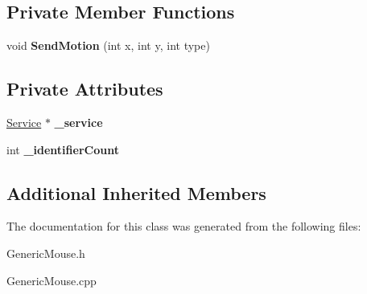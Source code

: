 \subsection*{Private Member Functions}
\begin{DoxyCompactItemize}
\item 
\mbox{\label{class_generic_mouse_aa1bff7fce968f5e27d5922b17e4a4541}} 
void {\bfseries Send\+Motion} (int x, int y, int type)
\end{DoxyCompactItemize}
\subsection*{Private Attributes}
\begin{DoxyCompactItemize}
\item 
\mbox{\label{class_generic_mouse_a44d0165cb5da8ccb90acd9ea4a4419d1}} 
\hyperlink{class_provider_driver_1_1_service}{Service} $\ast$ {\bfseries \+\_\+service}
\item 
\mbox{\label{class_generic_mouse_a53d0c2374616e0f4b1779fb35a725949}} 
int {\bfseries \+\_\+identifier\+Count}
\end{DoxyCompactItemize}
\subsection*{Additional Inherited Members}


The documentation for this class was generated from the following files\+:\begin{DoxyCompactItemize}
\item 
Generic\+Mouse.\+h\item 
Generic\+Mouse.\+cpp\end{DoxyCompactItemize}
